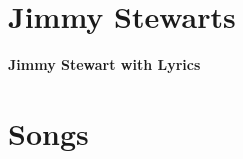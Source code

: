 \documentclass[8pt]{book}
\makeatletter
\let\mcnewpage=\newpage
\newcommand{\TrickSupertabularIntoMulticols}{
\renewcommand\newpage{
    \if@firstcolumn
        \hrule width\linewidth height0pt
            \columnbreak
        \else
          \mcnewpage
        \fi
}}
\makeatother
\begin{document}
\chapter{Jimmy Stewarts}

\begin{multicols*}{5}
\setlength{\tabcolsep}{1pt}
\TrickSupertabularIntoMulticols

\begin{center}\textbf{Jimmy Stewart with Lyrics}\end{center}

\end{multicols*}


\chapter{Songs}

\setlength{\columnseprule}{0.5pt}
\setlength{\tabcolsep}{3pt}
\begin{multicols*}{4}
\TrickSupertabularIntoMulticols
\begin{footnotesize}

\end{footnotesize}
\end{multicols*}
\end{document}
